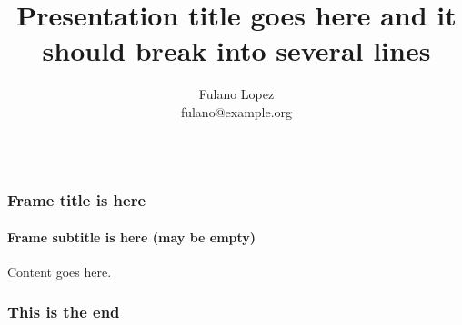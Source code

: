 \documentclass{beamer}
\begin{document}
\title{Presentation title goes here and it should break into several lines}
\author{Fulano Lopez\\
fulano@example.org \\~ 
}

\begin{frame}
    \maketitle
\end{frame}


\begin{frame}[fragile]
    \frametitle{Frame title is here}
    \framesubtitle{Frame subtitle is here (may be empty)}
    Content goes here.
\end{frame}

\begin{frame}[fragile]
\frametitle{This is the end}
\end{frame}
\end{document}
